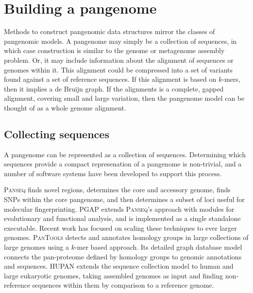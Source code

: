 \section{Building a pangenome}

Methods to construct pangenomic data structures mirror the classes of pangenomic models.
A pangenome may simply be a collection of sequences, in which case construction is similar to the genome or metagenome assembly problem.
Or, it may include information about the alignment of sequences or genomes within it.
This alignment could be compressed into a set of variants found against a set of reference sequences.
If this alignment is based on $k$-mers, then it implies a de Bruijn graph.
If the alignments is a complete, gapped alignment, covering small and large variation, then the pangenome model can be thought of as a whole genome alignment.

\subsection{Collecting sequences}

A pangenome can be represented as a collection of sequences.
Determining which sequences provide a compact represenation of a pangenome is non-trivial, and a number of software systems have been developed to support this process.

\textsc{Panseq} \cite{Laing_2010} finds novel regions, determines the core and accessory genome, finds SNPs within the core pangenome, and then determines a subset of loci useful for molecular fingerprinting.
\textsc{PGAP} \cite{Zhao_2011} extends \textsc{Panseq}'s approach with modules for evolutionary and functional analysis, and is implemented as a single standalone executable.
Recent work has focused on scaling these techniques to ever larger genomes.
\textsc{PanTools} \cite{Sheikhizadeh_Anari_2018} detects and annotates homology groups in large collections of large genomes using a $k$-mer based approach.
Its detailed graph database model connects the pan-proteome defined by homology groups to genomic annotations and sequences.
\textsc{HUPAN} \citep{Duan_2019} extends the sequence collection model to human and large eukaryotic genomes, taking assembled genomes as input and finding non-reference sequences within them by comparison to a reference genome.

